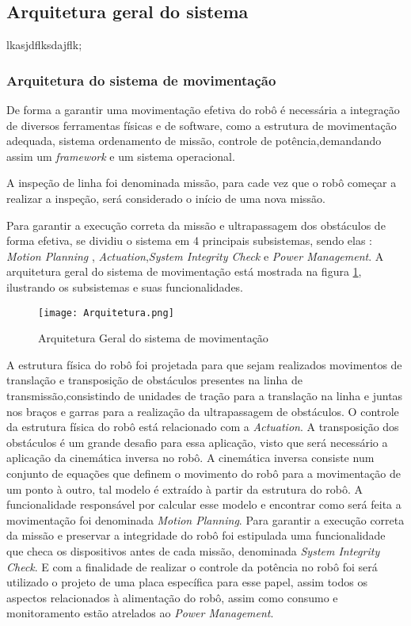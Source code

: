 \subsection{Arquitetura geral do sistema}
\label{ssec:arqg}
lkasjdflksdajflk;

\subsubsection{Arquitetura do sistema de movimentação}
De forma a garantir uma movimentação efetiva do robô é necessária a integração de diversos ferramentas físicas e de software, como a estrutura de movimentação adequada, sistema ordenamento de missão, controle de potência,demandando assim um \textit{framework} e um sistema operacional.

A inspeção de linha foi denominada missão, para cade vez que o robô começar a realizar a inspeção, será considerado o início de uma nova missão. 

Para garantir a execução correta da missão e ultrapassagem dos obstáculos de forma efetiva, se dividiu o sistema em 4 principais subsistemas, sendo elas : \textit{Motion Planning} , \textit{Actuation},\textit{System Integrity Check} e \textit{Power Management}. A arquitetura geral do sistema de movimentação está mostrada na figura \ref{fig:arq_geral}, ilustrando os subsistemas e suas funcionalidades. 
\begin{figure}[h]
	\centering
	\texttt{[image: Arquitetura.png]}
	\caption{Arquitetura Geral do sistema de movimentação}
	\label{fig:arq_geral}
\end{figure} 
A estrutura física do robô foi projetada para que sejam realizados movimentos de translação e transposição de obstáculos presentes na linha de transmissão,consistindo de unidades de tração para a translação na linha e juntas nos braços e garras para a realização da ultrapassagem de obstáculos. O controle da estrutura física do robô está relacionado com a \textit{Actuation}.
A transposição dos obstáculos é um grande desafio para essa aplicação, visto que será necessário a aplicação da cinemática inversa no robô. A cinemática inversa consiste num conjunto de equações que definem o movimento do robô para a movimentação de um ponto à outro, tal modelo é extraído à partir da estrutura do robô. A funcionalidade responsável por calcular esse modelo e encontrar como será feita a movimentação foi denominada \textit{Motion Planning}.
Para garantir a execução correta da missão e preservar a integridade do robô foi estipulada uma funcionalidade que checa os dispositivos antes de cada missão, denominada \textit{System Integrity Check}. E com a finalidade de realizar o controle da potência no robô foi será utilizado o projeto de uma placa específica para esse papel, assim todos os aspectos relacionados à alimentação do robô, assim como consumo e monitoramento estão atrelados ao \textit{Power Management}.

